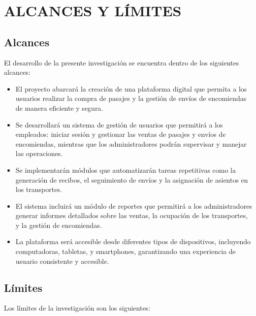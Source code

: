 \documentclass[12pt,letterpaper]{article}
\begin{document}
\section{ALCANCES Y LÍMITES}
\subsection{Alcances}

El desarrollo de la presente investigación se encuentra dentro de los siguientes alcances:

\begin{itemize}[label=$\bullet$, left=0cm, labelsep = 1.05cm, topsep = 0pt, parsep = 0pt]

	\item El proyecto abarcará la creación de una plataforma digital que permita a los usuarios realizar la compra de pasajes y la gestión de envíos de encomiendas de manera eficiente y segura.

	\item Se desarrollará un sistema de gestión de usuarios que permitirá a los empleados: iniciar sesión y gestionar las ventas de pasajes y envíos de encomiendas, mientras que los administradores podrán supervisar y manejar las operaciones.

	\item Se implementarán módulos que automatizarán tareas repetitivas como la generación de recibos, el seguimiento de envíos y la asignación de asientos en los transportes.

	\item El sistema incluirá un módulo de reportes que permitirá a los administradores generar informes detallados sobre las ventas, la ocupación de los transportes, y la gestión de encomiendas.

	\item La plataforma será accesible desde diferentes tipos de dispositivos, incluyendo computadoras, tabletas, y smartphones, garantizando una experiencia de usuario consistente y accesible.

\end{itemize}

\subsection{Límites}

Los límites de la investigación son los siguientes:
\end{document}

